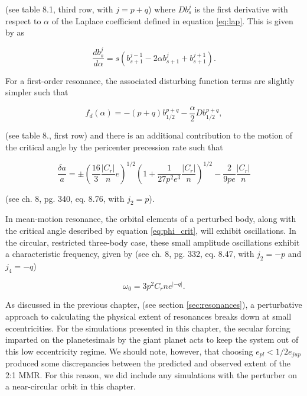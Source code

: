 \noindent (see \cite{murray99} table 8.1, third row, with $j = p + q$) where $D b^{j}_{s}$ is the first derivative with respect to $
\alpha$ of the Laplace coefficient defined in equation \ref{eq:lap}. This is given by \cite{brouwer61} as

\begin{equation}\label{eq:lap_d}
	\frac{d b_{s}^{j}}{d \alpha} = s \left( b_{s+1}^{j-1} - 2 \alpha b_{s+1}^{j} + b_{s+1}^{j+1} \right).
\end{equation}

For a first-order resonance, the associated disturbing function terms are slightly simpler such that

\begin{equation}\label{eq:fd_fo}
	f_{d}(\alpha) = -(p+q) b_{1/2}^{p+q} - \frac{\alpha}{2} D b_{1/2}^{p+q},
\end{equation}

\noindent (see \cite{murray99} table 8., first row) and there is an additional contribution to the motion of the critical angle by the 
pericenter precession rate such that

\begin{equation}\label{eq:res_fo}
	\frac{\delta a}{a} = \pm \left(\frac{16}{3} \frac{\left| C_{r} \right|}{n} e \right)^{1/2} \left(  1 + \frac{1}{27 p^2 e^3} \frac{\left| C_{r} \right|}{n} 
	\right)^{1/2} - \frac{2}{9 p e}  \frac{\left| C_{r} \right|}{n}
\end{equation}

\noindent (see \cite{murray99} ch. 8, pg. 340, eq. 8.76, with $j_{2} = p$).

In mean-motion resonance, the orbital elements of a perturbed body, along with the critical angle described by equation
\ref{eq:phi_crit}, will exhibit oscillations. In the circular, restricted three-body case, these small amplitude oscillations exhibit a 
characteristic frequency, given by (see \cite{murray99} ch. 8, pg. 332, eq. 8.47, with $j_{2} =-p$ and $j_{4} = -q$)

\begin{equation}\label{eq:lib_time}
	\omega_{0} = 3 p^{2} C_{r} n e^{\left| -q \right|}.
\end{equation}

As discussed in the previous chapter, (see section \ref{sec:resonances}), a perturbative approach to calculating the physical extent of resonances breaks down at small eccentricities. For the simulations presented in this chapter, the secular forcing imparted on the planetesimals by the giant planet acts to keep the system out of this low eccentricity regime. We should note, however, that choosing $e_{pl} < 1/2 e_{jup}$ produced some discrepancies between the predicted and observed extent of the 2:1 MMR. For this reason, we did include any simulations with the perturber on a near-circular orbit in this chapter.

